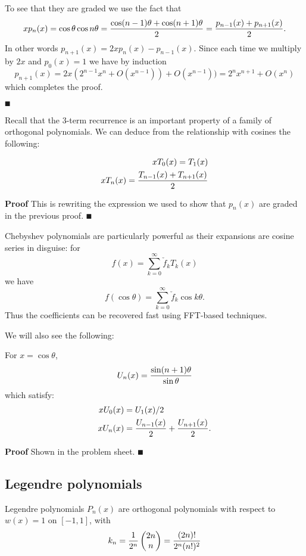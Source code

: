 To see that they are graded we use the fact that
\[
x p_n(x) = \cos \ensuremath{\theta} \cos n \ensuremath{\theta} = {\cos(n-1)\ensuremath{\theta} + \cos(n+1)\ensuremath{\theta} \over 2} = {p_{n-1}(x) + p_{n+1}(x) \over 2}.
\]
In other words $p_{n+1}(x) = 2x p_n(x) - p_{n-1}(x)$. Since each time we multiply by $2x$ and $p_0(x) = 1$ we have by induction
\[
p_{n+1}(x) = 2x (2^{n-1}x^n + O(x^{n-1})) + O(x^{n-1})) = 2^n x^{n+1} + O(x^n)
\]
which completes the proof.

\ensuremath{\QED}

Recall that the 3-term recurrence is an important property of a family of orthogonal polynomials. We can deduce from the relationship with cosines the following:

\begin{corollary}
\begin{align*}
x T_0(x) = T_1(x) \\
x T_n(x) = {T_{n-1}(x) + T_{n+1}(x) \over 2}
\end{align*}
\end{corollary}
\textbf{Proof} This is rewriting the expression we used to show that $p_n(x)$ are graded in the previous proof. \ensuremath{\QED}

Chebyshev polynomials are particularly powerful as their expansions are cosine series in disguise: for
\[
f(x) = \ensuremath{\sum}_{k=0}^\ensuremath{\infty} \check f_k T_k(x)
\]
we have
\[
f(\cos \ensuremath{\theta}) = \ensuremath{\sum}_{k=0}^\ensuremath{\infty} \check f_k \cos k \ensuremath{\theta}.
\]
Thus the coefficients can be recovered fast using FFT-based techniques.

We will also see the following:

\begin{theorem} For $x = \cos \ensuremath{\theta}$,
\[
U_n(x) = {\sin(n+1) \ensuremath{\theta} \over \sin \ensuremath{\theta}}
\]
which satisfy:
\begin{align*}
x U_0(x) &= U_1(x)/2 \\
x U_n(x) &= {U_{n-1}(x) \over 2} + {U_{n+1}(x) \over 2}.
\end{align*}
\end{theorem}
\textbf{Proof} Shown in the problem sheet. \ensuremath{\QED}

\subsection{Legendre polynomials}
\begin{definition}[Legendre] Legendre polynomials $P_n(x)$ are orthogonal polynomials with respect to $w(x) = 1$ on $[-1,1]$, with
\[
k_n = {1 \over 2^n} \begin{pmatrix} 2n \\ n \end{pmatrix} =
{(2n)! \over 2^n (n!)^2}
\]
\end{definition}

